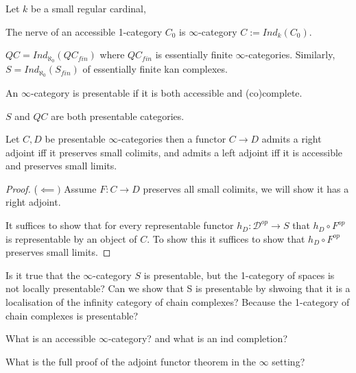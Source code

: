 \begin{definition}
    Let $k$ be a small regular cardinal, 
\end{definition}

\begin{definition}
    The nerve of an accessible 1-category $C_0$ is $\infty$-category $C:=Ind_k(C_0)$.
\end{definition}

\begin{example}
    $QC=Ind_{\aleph_0}(QC_{fin})$ where $QC_{fin}$ is essentially finite $\infty$-categories.
    Similarly, $S=Ind_{\aleph_0}(S_{fin})$ of essentially finite kan complexes.
\end{example}

\begin{definition}
    An $\infty$-category is presentable if it is both accessible and (co)complete.

\end{definition}
\begin{example}
    $S$ and $QC$ are both presentable categories.
\end{example}

\begin{theorem}
    Let $C, D$ be presentable $\infty$-categories then a functor $C \to D$ admits a right adjoint iff it preserves small colimits, and admits a left adjoint iff it is accessible and preserves small limits.
\end{theorem}
\begin{proof}($\impliedby)$
Assume $F: C \to D$ preserves all small colimits, we will show it has a right adjoint.

It suffices to show that for every representable functor $h_D:\mathcal{D}^{op} \to S$ that $h_D\circ F^{op}$ is representable by an object of $C$. To show this it suffices to show that $h_D\circ F^{op}$ preserves small limits.
\end{proof}

\begin{question}
    Is it true that the $\infty$-category $S$ is presentable, but the 1-category of spaces is not locally presentable?
    Can we show that S is presentable by shwoing that it is a localisation of the infinity category of chain complexes? Because the 1-category of chain complexes is presentable?
\end{question}

\begin{question}
What is an accessible $\infty$-category? and what is an ind completion? 
\end{question}

\begin{question}
    What is the full proof of the adjoint functor theorem in the $\infty$ setting?
\end{question}

